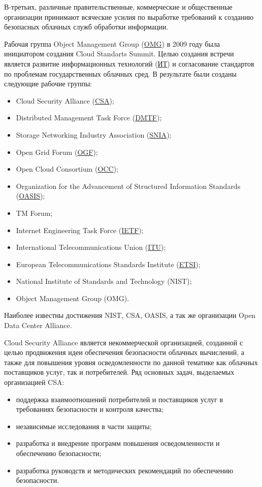В-третьих, различные правительственные, коммерческие и общественные организации принимают всяческие усилия по выработке требований к созданию безопасных облачных служб обработки информации.

Рабочая группа Object Management Group (\hyperlink{omg}{OMG}) в 2009 году была инициатором создания Cloud Standarts Summit.
Целью создания встречи является развитие информационных технологий (\hyperlink{it}{ИТ}) и согласование стандартов по проблемам государственных облачных сред.
В результате были созданы следующие рабочие группы:
\begin{itemize}
  \item Cloud Security Alliance (\hyperlink{csa}{CSA});
  \item Distributed Management Task Force (\hyperlink{dmtf}{DMTF});
  \item Storage Networking Industry Association (\hyperlink{snia}{SNIA});
  \item Open Grid Forum (\hyperlink{ogf}{OGF});
  \item Open Cloud Consortium (\hyperlink{occ}{OCC});
  \item Organization for the Advancement of Structured Information Standards (\hyperlink{oasis}{OASIS});
  \item TM Forum;
  \item Internet Engineering Task Force (\hyperlink{ietf}{IETF});
  \item International Telecommunications Union (\hyperlink{itu}{ITU});
  \item European Telecommunications Standards Institute (\hyperlink{etsi}{ETSI});
  \item National Institute of Standards and Technology (NIST);
  \item Object Management Group (OMG).
\end{itemize}

Наиболее известны достижения NIST, CSA, OASIS, а так же организации Open Data Center Alliance.

Cloud Security Alliance является некоммерческой организацией, созданной с целью продвижения идеи обеспечения безопасности облачных вычислений, а также для повышения уровня осведомленности по данной тематике как облачных поставщиков услуг, так и потребителей.
Ряд основных задач, выделаемых организацией CSA:
\begin{itemize}
  \item поддержка взаимоотношений потребителей и поставщиков услуг в требованиях безопасности и контроля качества;
  \item независимые исследования в части защиты;
  \item разработка и внедрение программ повышения осведомленности и обеспечению безопасности;
  \item разработка руководств и методических рекомендаций по обеспечению безопасности.
\end{itemize}

